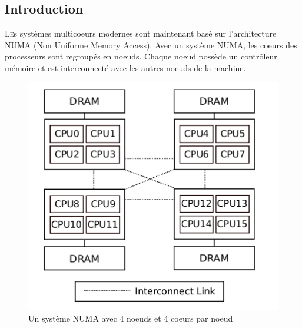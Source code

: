 \subsection{Introduction}

  \lettrine[nindent=0em,lines=3]{L} es systèmes multicoeurs modernes sont
  maintenant basé sur l'architecture NUMA (Non Uniforme Memory Access). Avec un
  système NUMA, les coeurs des processeurs sont regroupés en noeuds. Chaque
  noeud possède un contrôleur mémoire et est interconnecté avec les autres
  noeuds de la machine.

  \begin{figure}[H]
    \includegraphics[scale=0.4]{img/numa_arch.png}
    \caption{Un système NUMA avec 4 noeuds et 4 coeurs par noeud}
    \label{f:numa_arch}
  \end{figure}

